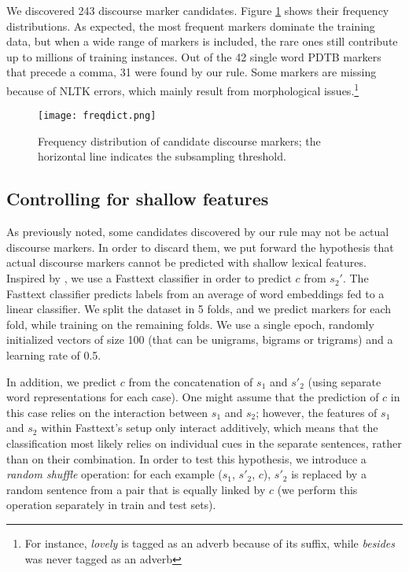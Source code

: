 \documentclass[11pt,a4paper]{article}
\begin{document}
We discovered 243 discourse marker candidates. Figure \ref{fig:freq} shows their frequency distributions. As expected, the most frequent markers dominate the training data, but when a wide range of markers is included, the rare ones still contribute up to millions of training instances. 
Out of the 42 single word PDTB markers that precede a comma, 31 were found by our rule. Some markers are missing because of NLTK errors, which mainly result from morphological issues.\footnote{For instance, {\it lovely} is tagged as an adverb because of its suffix, while {\it besides} was never tagged as an adverb}


\begin{figure}[]
  \centering
\texttt{[image: freqdict.png]}
  \caption{Frequency distribution of candidate discourse markers; 
  the horizontal line indicates the subsampling threshold.}
\label{fig:freq} 
\end{figure}


\subsection{Controlling for shallow features}
As previously noted, some candidates discovered by our rule may not be actual discourse markers. In order to discard them, we put forward the hypothesis that actual discourse markers cannot be predicted with shallow lexical features.
Inspired by \citet{Gururangan2018}, we use a Fasttext classifier \citep{joulin2016tricks} in order to predict $c$ from $s_2'$. The Fasttext classifier predicts labels from an average of word embeddings fed to a linear classifier. We split the dataset in 5 folds, and we predict markers for each fold, while training on the remaining folds. We use a single epoch, randomly initialized vectors of size 100 (that can be unigrams, bigrams or trigrams) and a learning rate of 0.5.


In addition, we predict $c$ from the concatenation of $s_1$ and $s'_2$ (using separate word representations for each case). One might assume that the prediction of $c$ in this case relies on the interaction between $s_1$ and $s_2$; however, the features of $s_1$ and $s_2$ within Fasttext's setup only interact additively, which means that the classification most likely relies on individual cues in the separate sentences, rather than on their combination.  In order to test this hypothesis, we introduce a \textit{random shuffle} operation: for each example ($s_1$, $s'_2$, $c$), $s'_2$ is replaced by a random sentence from a pair that is equally linked by $c$ (we perform this operation separately in train and test sets).
\end{document}

